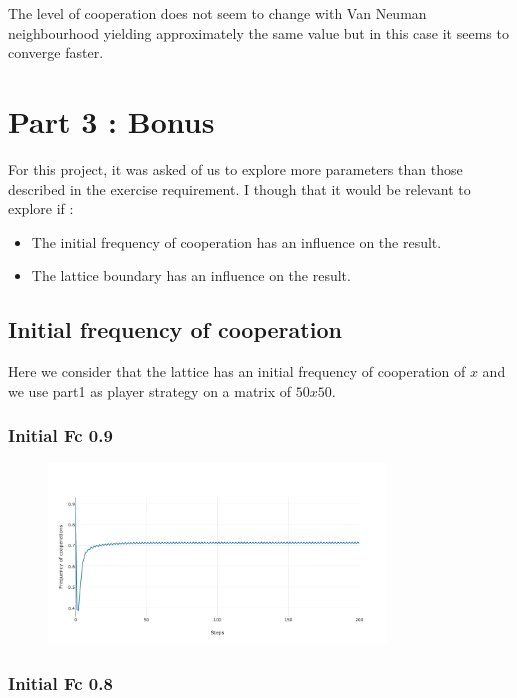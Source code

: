 \documentclass[11pt]{article}
\begin{document}
The level of cooperation does not seem to change with Van Neuman neighbourhood yielding approximately the same value but in this case it seems to converge faster.

\section{Part 3 : Bonus}

For this project, it was asked of us to explore more parameters than those described in the exercise requirement.
I though that it would be relevant to explore if : 
\begin{itemize}
	\item The initial frequency of cooperation has an influence on the result.
	\item The lattice boundary has an influence on the result.
\end{itemize}

\subsection{Initial frequency of cooperation}

Here we consider that the lattice has an initial frequency of cooperation of $x$ and we use part1 as player strategy on a matrix of $50x50$.


\subsubsection{Initial Fc 0.9}

\begin{figure}[H]
\centering
   \includegraphics[width=0.8\textwidth]{img/part3/bonus-01-D.png}
\end{figure}

\subsubsection{Initial Fc 0.8}
\end{document}
